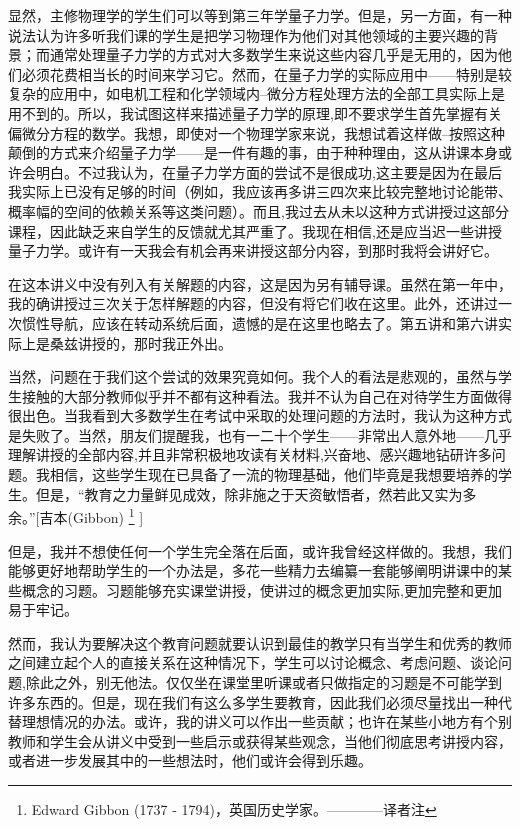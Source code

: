 \documentclass[UTF8, 12pt, a4paper, twoside]{ctexbook}
\begin{document}
显然，主修物理学的学生们可以等到第三年学量子力学。但是，另一方面，有一种说法认为许多听我们课的学生是把学习物理作为他们对其他领域的主要兴趣的背景；而通常处理量子力学的方式对大多数学生来说这些内容几乎是无用的，因为他们必须花费相当长的时间来学习它。然而，在量子力学的实际应用中——特别是较复杂的应用中，如电机工程和化学领域内--微分方程处理方法的全部工具实际上是用不到的。所以，我试图这样来描述量子力学的原理,即不要求学生首先掌握有关偏微分方程的数学。我想，即使对一个物理学家来说，我想试着这样做--按照这种颠倒的方式来介绍量子力学——是一件有趣的事，由于种种理由，这从讲课本身或许会明白。不过我认为，在量子力学方面的尝试不是很成功,这主要是因为在最后我实际上已没有足够的时间（例如，我应该再多讲三四次来比较完整地讨论能带、概率幅的空间的依赖关系等这类问题）。而且,我过去从未以这种方式讲授过这部分课程，因此缺乏来自学生的反馈就尤其严重了。我现在相信,还是应当迟一些讲授量子力学。或许有一天我会有机会再来讲授这部分内容，到那时我将会讲好它。
  
在这本讲义中没有列入有关解题的内容，这是因为另有辅导课。虽然在第一年中，我的确讲授过三次关于怎样解题的内容，但没有将它们收在这里。此外，还讲过一次惯性导航，应该在转动系统后面，遗憾的是在这里也略去了。第五讲和第六讲实际上是桑兹讲授的，那时我正外出。
  
当然，问题在于我们这个尝试的效果究竟如何。我个人的看法是悲观的，虽然与学生接触的大部分教师似乎并不都有这种看法。我并不认为自己在对待学生方面做得很出色。当我看到大多数学生在考试中采取的处理问题的方法时，我认为这种方式是失败了。当然，朋友们提醒我，也有一二十个学生——非常出人意外地——几乎理解讲授的全部内容,并且非常积极地攻读有关材料,兴奋地、感兴趣地钻研许多问题。我相信，这些学生现在已具备了一流的物理基础，他们毕竟是我想要培养的学生。但是，“教育之力量鲜见成效，除非施之于天资敏悟者，然若此又实为多余。”[吉本(Gibbon) \footnote{Edward Gibbon (1737 - 1794)，英国历史学家。————译者注} ]
  
但是，我并不想使任何一个学生完全落在后面，或许我曾经这样做的。我想，我们能够更好地帮助学生的一个办法是，多花一些精力去编纂一套能够阐明讲课中的某些概念的习题。习题能够充实课堂讲授，使讲过的概念更加实际,更加完整和更加易于牢记。

然而，我认为要解决这个教育问题就要认识到最佳的教学只有当学生和优秀的教师之间建立起个人的直接关系在这种情况下，学生可以讨论概念、考虑问题、谈论问题,除此之外，别无他法。仅仅坐在课堂里听课或者只做指定的习题是不可能学到许多东西的。但是，现在我们有这么多学生要教育，因此我们必须尽量找出一种代替理想情况的办法。或许，我的讲义可以作出一些贡献；也许在某些小地方有个别教师和学生会从讲义中受到一些启示或获得某些观念，当他们彻底思考讲授内容，或者进一步发展其中的一些想法时，他们或许会得到乐趣。
\end{document}
